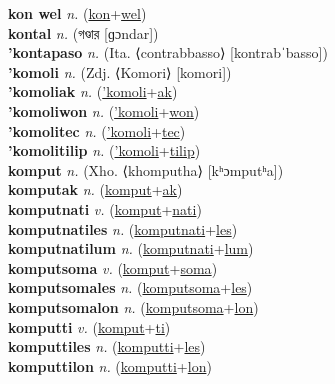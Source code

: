 \textbf{kon wel} \textit{n.} (\hyperref[kon]{kon}+\hyperref[wel]{wel})
 \label{kon wel} \\
\textbf{kontal} \textit{n.} ({\bengali{}গণ্ডার} [ɡɔndar])
 \label{kontal} \\
\textbf{'kontapaso} \textit{n.} (Ita. ⟨contrabbasso⟩ [kontrabˈbasso])
 \label{'kontapaso} \\
\textbf{'komoli} \textit{n.} (Zdj. ⟨Komori⟩ [komori])
 \label{'komoli} \\
\textbf{'komoliak} \textit{n.} (\hyperref['komoli]{'komoli}+\hyperref[ak]{ak})
 \label{'komoliak} \\
\textbf{'komoliwon} \textit{n.} (\hyperref['komoli]{'komoli}+\hyperref[won]{won})
 \label{'komoliwon} \\
\textbf{'komolitec} \textit{n.} (\hyperref['komoli]{'komoli}+\hyperref[tec]{tec})
 \label{'komolitec} \\
\textbf{'komolitilip} \textit{n.} (\hyperref['komoli]{'komoli}+\hyperref[tilip]{tilip})
 \label{'komolitilip} \\
\textbf{komput} \textit{n.} (Xho. ⟨khomputha⟩ [kʰɔmputʰa])
 \label{komput} \\
\textbf{komputak} \textit{n.} (\hyperref[komput]{komput}+\hyperref[ak]{ak})
 \label{komputak} \\
\textbf{komputnati} \textit{v.} (\hyperref[komput]{komput}+\hyperref[nati]{nati})
 \label{komputnati} \\
\textbf{komputnatiles} \textit{n.} (\hyperref[komputnati]{komputnati}+\hyperref[les]{les})
 \label{komputnatiles} \\
\textbf{komputnatilum} \textit{n.} (\hyperref[komputnati]{komputnati}+\hyperref[lum]{lum})
 \label{komputnatilum} \\
\textbf{komputsoma} \textit{v.} (\hyperref[komput]{komput}+\hyperref[soma]{soma})
 \label{komputsoma} \\
\textbf{komputsomales} \textit{n.} (\hyperref[komputsoma]{komputsoma}+\hyperref[les]{les})
 \label{komputsomales} \\
\textbf{komputsomalon} \textit{n.} (\hyperref[komputsoma]{komputsoma}+\hyperref[lon]{lon})
 \label{komputsomalon} \\
\textbf{komputti} \textit{v.} (\hyperref[komput]{komput}+\hyperref[ti]{ti})
 \label{komputti} \\
\textbf{komputtiles} \textit{n.} (\hyperref[komputti]{komputti}+\hyperref[les]{les})
 \label{komputtiles} \\
\textbf{komputtilon} \textit{n.} (\hyperref[komputti]{komputti}+\hyperref[lon]{lon})
